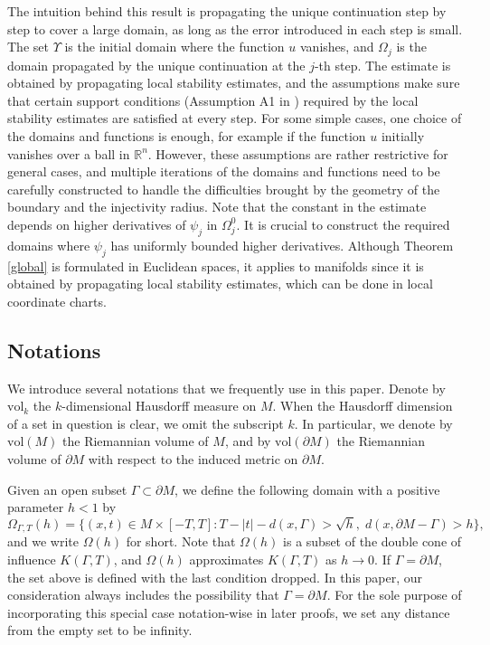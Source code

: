 \documentclass[11pt,letterpaper]{amsart}
\numberwithin{equation}{section}
\theoremstyle{definition}
\theoremstyle{plain}
\theoremstyle{definition}
\theoremstyle{plain}
\theoremstyle{definition}
\newtheorem{definition-Omega}[Def-CATradius]{Definition}
\theoremstyle{plain}
\newcommand{\vol}{\textrm{vol}}
\begin{document}
The intuition behind this result is propagating the unique continuation step by step to cover a large domain, as long as the error introduced in each step is small. The set $\Upsilon$ is the initial domain where the function $u$ vanishes, and $\Omega_j$ is the domain propagated by the unique continuation at the $j$-th step. The estimate is obtained by propagating local stability estimates, and the assumptions make sure that certain support conditions (Assumption A1 in \cite{BKL1}) required by the local stability estimates are satisfied at every step. For some simple cases, one choice of the domains and functions is enough, for example if the function $u$ initially vanishes over a ball in $\mathbb{R}^{n}$. However, these assumptions are rather restrictive for general cases, and multiple iterations of the domains and functions need to be carefully constructed to handle the difficulties brought by the geometry of the boundary and the injectivity radius. Note that the constant in the estimate depends on higher derivatives of $\psi_j$ in $\Omega_{j}^0$. It is crucial to construct the required domains where $\psi_j$ has uniformly bounded higher derivatives. Although Theorem \ref{global} is formulated in Euclidean spaces, it applies to manifolds since it is obtained by propagating local stability estimates, which can be done in local coordinate charts.

\subsection{Notations}\label{subsection-notations}
We introduce several notations that we frequently use in this paper. Denote by $\vol_k$ the $k$-dimensional Hausdorff measure on $M$. When the Hausdorff dimension of a set in question is clear, we omit the subscript $k$. In particular, we denote by $\vol(M)$ the Riemannian volume of $M$, and by $\vol(\partial M)$ the Riemannian volume of $\partial M$ with respect to the induced metric on $\partial M$.

Given an open subset $\Gamma\subset\partial M$, we define the following domain with a positive parameter $h<1$ by
\begin{equation}\label{Omegaht}
\Omega_{\Gamma,T}(h)=\big\{(x,t)\in M\times [-T,T]: T-|t|-d(x,\Gamma) >\sqrt{h},\; d(x,\partial M-\Gamma)>h \big\},
\end{equation}
and we write $\Omega(h)$ for short. Note that $\Omega(h)$ is a subset of the double cone of influence $K(\Gamma,T)$, and $\Omega(h)$ approximates $K(\Gamma,T)$ as $h\to 0$. If $\Gamma=\partial M$, the set above is defined with the last condition dropped. In this paper, our consideration always includes the possibility that $\Gamma=\partial M$. For the sole purpose of incorporating this special case notation-wise in later proofs, we set any distance from the empty set to be infinity.
\end{document}
